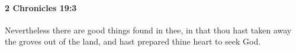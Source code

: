 
		\paragraph{2 Chronicles 19:3} %
			\label{2CHRONICLES-19-3}

			Nevertheless there are good things found in thee, in that thou hast taken away the groves out of the land, and hast prepared thine heart to seek God.


